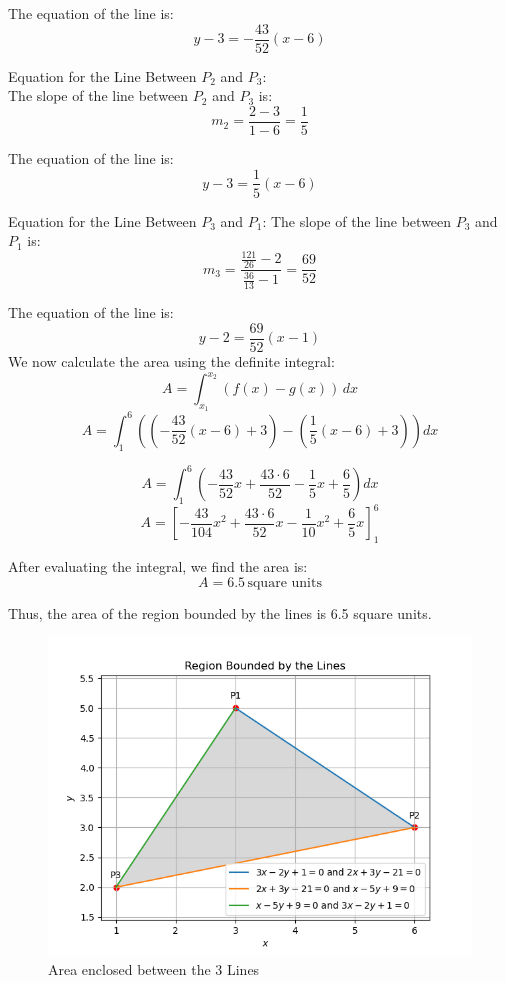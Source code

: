 \documentclass[journal]{IEEEtran}
\begin{document}
The equation of the line is:
\begin{equation}
y - 3 = -\frac{43}{52}(x - 6)
\end{equation}

Equation for the Line Between $P_2$ and $P_3$:\\
The slope of the line between $P_2$ and $P_3$ is:
\begin{equation}
m_2 = \frac{2 - 3}{1 - 6} = \frac{1}{5}
\end{equation}

The equation of the line is:
\begin{equation}
y - 3 = \frac{1}{5}(x - 6)
\end{equation}

Equation for the Line Between $P_3$ and $P_1$:
The slope of the line between $P_3$ and $P_1$ is:
\begin{equation}
m_3 = \frac{\frac{121}{26} - 2}{\frac{36}{13} - 1} = \frac{69}{52}
\end{equation}

The equation of the line is:
\begin{equation}
y - 2 = \frac{69}{52}(x - 1)
\end{equation}
We now calculate the area using the definite integral:
\begin{equation}
A = \int_{x_1}^{x_2} \left( f(x) - g(x) \right) \, dx
\end{equation}
\begin{equation}
A = \int_{1}^{6} \left( \left( -\frac{43}{52}(x - 6) + 3 \right) - \left( \frac{1}{5}(x - 6) + 3 \right) \right) dx
\end{equation}

\begin{equation}
A = \int_{1}^{6} \left( -\frac{43}{52}x + \frac{43 \cdot 6}{52} - \frac{1}{5}x + \frac{6}{5} \right) dx
\end{equation}
\begin{equation}
A = \left[ -\frac{43}{104}x^2 + \frac{43 \cdot 6}{52}x - \frac{1}{10}x^2 + \frac{6}{5}x \right]_{1}^{6}
\end{equation}

After evaluating the integral, we find the area is:
\begin{equation}
A = 6.5 \, \text{square units}
\end{equation}

Thus, the area of the region bounded by the lines is 6.5 square units.
\begin{figure}[h!]
	\centering
	\includegraphics[width=0.5\linewidth]{figs/Figure_1.png}
	\caption{Area enclosed between the 3 Lines}
	\label{stemplot}
\end{figure}	
\end{document}

